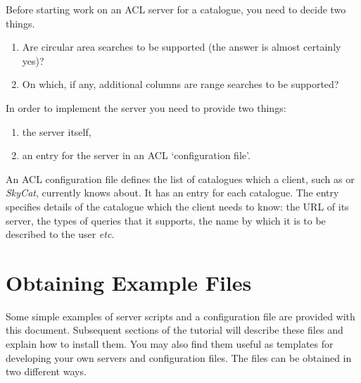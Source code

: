 \documentclass[twoside,11pt,nolof,chapters]{starlink}
\begin{document}
Before starting work on an ACL server for a catalogue, you need to decide
two things.

\begin{enumerate}

  \item Are circular area searches to be supported (the answer is almost
   certainly yes)?

  \item On which, if any, additional columns are range searches to be
   supported?

\end{enumerate}

In order to implement the server you need to provide two things:

\begin{enumerate}

  \item the server itself,

  \item an entry for the server in an ACL `configuration file'.

\end{enumerate}

An ACL configuration file defines the list of catalogues which a client,
such as  or \textit{SkyCat}, currently knows about.  It
has an entry for each catalogue.  The entry specifies details of the
catalogue which the client needs to know: the URL of its server, the
types of queries that it supports, the name by which it is to be described
to the user \emph{etc}.


\section{\label{OBTAIN_T}Obtaining Example Files}

Some simple examples of server scripts and a configuration file are
provided with this document.  Subsequent sections of the tutorial
will describe these files and explain how to install them.  You may
also find them useful as templates for developing your own servers
and configuration files.  The files can be obtained in two different ways.
\end{document}
